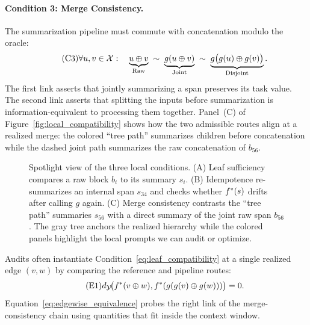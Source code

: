\paragraph{Condition 3: Merge Consistency.}
The summarization pipeline must commute with concatenation modulo the oracle:
\begin{equation}\tag{C3}\label{eq:leaf_compatibility}
\forall u, v \in \mathcal{X}:\quad
\underbrace{u \oplus v}_{\text{Raw}} \;\sim\;
\underbrace{g(u \oplus v)}_{\text{Joint}} \;\sim\;
\underbrace{g\big(g(u) \oplus g(v)\big)}_{\text{Disjoint}}.
\end{equation}
The first link asserts that jointly summarizing a span preserves its task value. The second link asserts that splitting the inputs before summarization is information-equivalent to processing them together. Panel~(C) of Figure~\ref{fig:local_compatibility} shows how the two admissible routes align at a realized merge: the colored ``tree path'' summarizes children before concatenation while the dashed joint path summarizes the raw concatenation of $b_{56}$.

\begin{figure}[t]
    \centering
    
    \caption{Spotlight view of the three local conditions. (A) Leaf sufficiency compares a raw block $b_i$ to its summary $s_i$. (B) Idempotence re-summarizes an internal span $s_{34}$ and checks whether $f^{\ast}(s)$ drifts after calling $g$ again. (C) Merge consistency contrasts the ``tree path'' summaries $s_{56}$ with a direct summary of the joint raw span $b_{56}$. The gray tree anchors the realized hierarchy while the colored panels highlight the local prompts we can audit or optimize.}
    \label{fig:local_compatibility}
    \label{fig:probabilistic_audit}
\end{figure}

\begin{remark}\label{rem:edgewise_compatibility}
Audits often instantiate Condition~\eqref{eq:leaf_compatibility} at a single realized edge $(v, w)$ by comparing the reference and pipeline routes:
\begin{equation}\tag{E1}\label{eq:edgewise_equivalence}
d_{\mathcal{Y}}\!\big(f^{\ast}(v \oplus w), f^{\ast}(g(g(v) \oplus g(w)))\big) = 0.
\end{equation}
Equation~\eqref{eq:edgewise_equivalence} probes the right link of the merge-consistency chain using quantities that fit inside the context window.
\end{remark}


